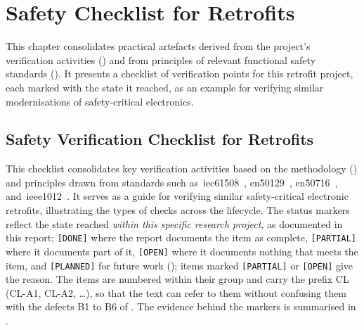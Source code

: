 \chapter{Safety Checklist for Retrofits}
\label{chap:safety_checklist}

This chapter consolidates practical artefacts derived from the project's verification activities () and from principles of relevant functional safety standards (). It presents a checklist of verification points for this retrofit project, each marked with the state it reached, as an example for verifying similar modernisations of safety-critical electronics.

\section{Safety Verification Checklist for Retrofits}
\label{sec:safety_checklist_items}

This checklist consolidates key verification activities based on the methodology () and principles drawn from standards such as~\gls{iec61508}~\cite{iec61508_2010}, \gls{en50129}~\cite{en50129_2018}, \gls{en50716}~\cite{en50716_2023}, and~\gls{ieee1012}~\cite{ieee1012_2024}. It serves as a guide for verifying similar safety-critical electronic retrofits, illustrating the types of checks across the lifecycle. The status markers reflect the state reached \textit{within this specific research project}, as documented in this report: \texttt{[DONE]} where the report documents the item as complete, \texttt{[PARTIAL]} where it documents part of it, \texttt{[OPEN]} where it documents nothing that meets the item, and \texttt{[PLANNED]} for future work (); items marked \texttt{[PARTIAL]} or \texttt{[OPEN]} give the reason. The items are numbered within their group and carry the prefix CL (CL-A1, CL-A2, \dots), so that the text can refer to them without confusing them with the defects B1 to B6 of . The evidence behind the markers is summarised in .

\bigskip

